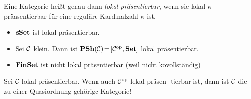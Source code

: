 \documentclass{cheat-sheet}
\begin{document}
\begin{defn}
  Eine Kategorie heißt genau dann \emph{lokal präsentierbar}, wenn sie lokal $\kappa$-präasentierbar für eine reguläre Kardinalzahl $\kappa$ ist.
\end{defn}

\begin{bspe}
  \begin{itemize}
    \item $\mathbf{sSet}$ ist lokal präsentierbar.
    \item Sei $\mathcal{C}$ klein. Dann ist $\mathbf{PSh}(\mathcal{C}) \!=\! [\mathcal{C}^{\mathrm{op}}, \mathbf{Set}]$ lokal präsentierbar.
    \item $\mathbf{FinSet}$ ist nicht lokal präsentierbar (weil nicht kovollständig)
  \end{itemize}
\end{bspe}

\begin{fun}
  Sei $\mathcal{C}$ lokal präsentierbar. Wenn auch $\mathcal{C}^{\mathrm{op}}$ lokal präsen- tierbar ist, dann ist $\mathcal{C}$ die zu einer Quasiordnung gehörige Kategorie!
\end{fun}

\pagebreak

\end{document}
